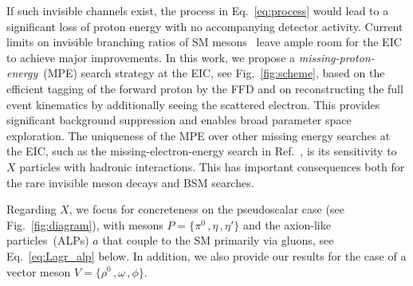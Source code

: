 \documentclass[aps,prd,preprintnumbers,superscriptaddress,nofootinbib,floatfix,twocolumn,notitlepage,reprint]{revtex4-2}
\begin{document}
If such invisible channels exist, the process in Eq.~\eqref{eq:process} would lead to a significant loss of proton energy with no accompanying detector activity. 
Current limits on invisible branching ratios of SM mesons~\cite{NA62:2020pwi,NA64:2024mah} leave ample room for the EIC to achieve major improvements.
In this work, we propose a \emph{missing-proton-energy}~(MPE) search strategy at the EIC, see Fig.~\ref{fig:scheme}, based on the efficient tagging of the forward proton by the FFD and on reconstructing the full event kinematics by additionally seeing the scattered electron. This provides significant background suppression and enables broad parameter space exploration. The uniqueness of the MPE over other missing energy searches at the EIC, such as the missing-electron-energy search in Ref.~\cite{Davoudiasl:2025rpn}, is its sensitivity to $X$ particles with hadronic interactions. This has important consequences both for the rare invisible meson decays and BSM searches.

Regarding $X$, we focus for concreteness on the pseudoscalar case (see Fig.~\ref{fig:diagram}), with mesons $P=\{\pi^0\,,\eta\,,\eta'\}$ and the axion-like particles~(ALPs) $a$ that couple to the SM primarily via gluons, see Eq.~\eqref{eq:Lagr_alp} below. In addition, we also provide our results for the case of a vector meson $V=\{\rho^0\,,\omega\,,\phi\}$.
\end{document}
